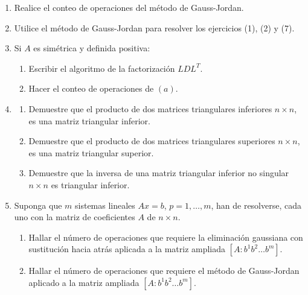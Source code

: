 \documentclass[12pt,letterpaper]{article}
\theoremstyle{plain}
\begin{document}
\begin{enumerate}
\item Realice el conteo de operaciones del m\'etodo de Gauss-Jordan.

\item Utilice el m\'etodo de Gauss-Jordan para resolver los ejercicios (1), (2) y (7).

\item Si $A$ es sim\'etrica y definida positiva:
  \begin{enumerate}
  \item Escribir el algoritmo de la factorizaci\'on $LDL^T$.
  \item Hacer el conteo de operaciones de $(a)$.
  \end{enumerate}

\item \begin{enumerate}
      \item Demuestre que el producto de dos matrices triangulares inferiores $n\times n$, es una matriz triangular inferior.
      \item Demuestre que el producto de dos matrices triangulares superiores $n\times n$, es una matriz triangular superior.
      \item Demuestre que la inversa de una matriz triangular inferior no singular $n\times n$ es triangular inferior.
      \end{enumerate}

\item  Suponga que $m$ sistemas lineales $Ax=b$, $p=1,\ldots,m$, han de resolverse, cada uno con la matriz de coeficientes $A$ de $n\times n$.
  \begin{enumerate}
    \item Hallar el n\'umero de operaciones que requiere la eliminaci\'on gaussiana con sustituci\'on hacia atr\'as aplicada a la matriz ampliada $[A : b^1 b^2 \ldots b^m ]$.
   \item Hallar el n\'umero de operaciones que requiere el m\'etodo de Gauss-Jordan aplicado a la matriz ampliada $[A : b^1 b^2 \ldots b^m ]$.

  \end{enumerate}


\end{enumerate}
\end{document}
